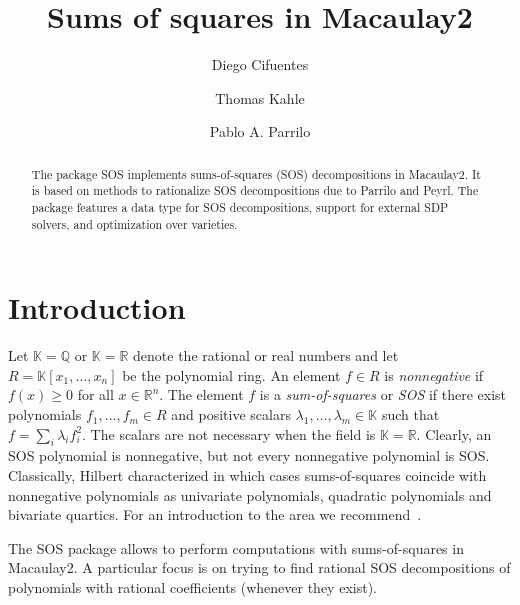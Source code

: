 \documentclass[11pt]{amsart}
\theoremstyle{plain}%
\theoremstyle{definition}
\theoremstyle{remark}
\newcommand{\Mac}{Macaulay2\xspace}
\newcommand{\SOS}{\textsc{SOS}\xspace}
\newcommand{\QQ}{\mathbb{Q}}
\newcommand{\RR}{\mathbb{R}}
\newcommand{\kk}{\mathbb{K}}
\begin{document}
\title[SOS.m2]{Sums of squares in Macaulay2}

\author{Diego Cifuentes}
\address{Massachusetts Institute of Technology \\ Cambridge, MA, USA}

\author{Thomas Kahle}
\address{Otto-von-Guericke University \\ Magdeburg, Germany}

\author{Pablo A. Parrilo}
\address{Massachusetts Institute of Technology \\ Cambridge, MA, USA}


\begin{abstract}
  The package \SOS implements sums-of-squares (SOS) decompositions in
  \Mac.
  It is based on methods to rationalize SOS decompositions due to Parrilo and Peyrl.
  The package features a data type for SOS decompositions, support for external SDP solvers, and optimization over varieties.
\end{abstract}

\maketitle

\section{Introduction}
\label{s:intro}

Let $\kk = \QQ$ or $\kk = \RR$ denote the rational or real numbers and let $R = \kk[x_{1},\dots,x_{n}]$ be the polynomial ring.  
An element $f\in R$ is \emph{nonnegative} if $f(x) \ge 0$ for all $x \in \RR^{n}$.  
The element $f$ is a \emph{sum-of-squares} or \emph{SOS} if there exist polynomials $f_{1},\dots,f_{m} \in R$ and positive scalars $\lambda_{1},\dots,\lambda_{m}\in \kk$ such that $f=\sum_{i}\lambda_i f_{i}^{2}$.
The scalars are not necessary when the field is $\kk=\RR$.
Clearly, an SOS polynomial is nonnegative, but not every nonnegative polynomial is SOS.
Classically, Hilbert characterized in which cases sums-of-squares coincide with nonnegative polynomials as univariate polynomials, quadratic polynomials and bivariate quartics.  
For an introduction to the area we recommend~\cite{scheiderer2009positivity,blekherman2012semidefinite}.

The \SOS package allows to perform computations with sums-of-squares in \Mac.
A particular focus is on trying to find rational SOS decompositions of polynomials with rational coefficients (whenever they exist).
\end{document}
